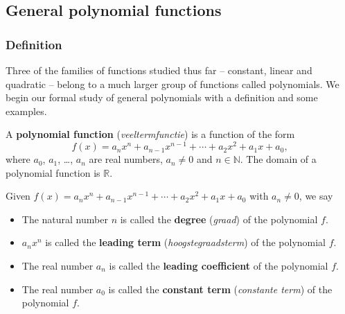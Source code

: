 \subsection{General polynomial functions}
\subsubsection{Definition}

Three of the families of functions studied thus far -- constant, linear and  quadratic -- belong to a much larger group of functions called polynomials.  We begin our formal study of general polynomials with a definition and some examples.
%
\begin{definition} \label{polynomialfunction} 
A \textbf{polynomial function} (\textit{veeltermfunctie}) is a function of the form \[ f(x) = a_{n} x^{n} + a_{n-1} x^{n-1} + \cdots + a_{2} x^{2} + a_{1} x + a_{0},\] where $a_{0}$, $a_{1}$, \ldots, $a_{n}$ are real numbers, $a_{n} \neq 0$ and $n \in \mathbb{N}$.  The domain of a polynomial function is $\mathbb{R}$.%

\end{definition}



Given $f(x) = a_{n} x^{n} + a_{n-1} x^{n-1} + \cdots + a_{2} x^{2} + a_{1} x + a_{0}$ with $a_{n} \neq 0$, we say 

\begin{itemize}

\item  The natural number $n$ is called the \textbf{degree} (\textit{graad}) of the polynomial $f$.

\item  $a_{n} x^{n}$ is called the \textbf{leading term} (\textit{hoogstegraadsterm}) of the polynomial $f$.

\item  The real number $a_{n}$ is called the \textbf{leading coefficient} of the polynomial $f$.

\item  The real number $a_{0}$ is called the   \textbf{constant term} (\textit{constante term}) of the polynomial $f$.

\end{itemize}

